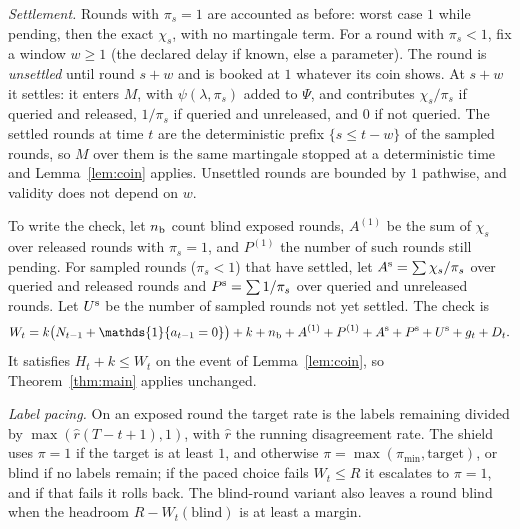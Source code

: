 \documentclass[10pt]{article}
\theoremstyle{plain}
\theoremstyle{definition}
\newcommand{\one}{\mathds{1}}
\begin{document}
\emph{Settlement.} Rounds with $\pi_s=1$ are accounted as before: worst case $1$ while pending, then the exact $\chi_s$, with no martingale term. For a round with $\pi_s<1$, fix a window $w\ge1$ (the declared delay if known, else a parameter). The round is \emph{unsettled} until round $s+w$ and is booked at $1$ whatever its coin shows. At $s+w$ it settles: it enters $M$, with $\psi(\lambda,\pi_s)$ added to $\Psi$, and contributes $\chi_s/\pi_s$ if queried and released, $1/\pi_s$ if queried and unreleased, and $0$ if not queried. The settled rounds at time $t$ are the deterministic prefix $\{s\le t-w\}$ of the sampled rounds, so $M$ over them is the same martingale stopped at a deterministic time and Lemma~\ref{lem:coin} applies. Unsettled rounds are bounded by $1$ pathwise, and validity does not depend on $w$.

To write the check, let $n_{\rm b}$ count blind exposed rounds, $A^{(1)}$ be the sum of $\chi_s$ over released rounds with $\pi_s=1$, and $P^{(1)}$ the number of such rounds still pending. For sampled rounds ($\pi_s<1$) that have settled, let $A^{\rm s}=\sum\chi_s/\pi_s$ over queried and released rounds and $P^{\rm s}=\sum1/\pi_s$ over queried and unreleased rounds. Let $U^{\rm s}$ be the number of sampled rounds not yet settled. The check is
\[
W_t=k\bigl(N_{t-1}+\one\{a_{t-1}=0\}\bigr)+k+n_{\rm b}+A^{(1)}+P^{(1)}+A^{\rm s}+P^{\rm s}+U^{\rm s}+g_t+D_t .
\]
It satisfies $H_t+k\le W_t$ on the event of Lemma~\ref{lem:coin}, so Theorem~\ref{thm:main} applies unchanged.

\emph{Label pacing.} On an exposed round the target rate is the labels remaining divided by $\max(\hat r(T-t+1),1)$, with $\hat r$ the running disagreement rate. The shield uses $\pi=1$ if the target is at least $1$, and otherwise $\pi=\max(\pi_{\min},\text{target})$, or blind if no labels remain; if the paced choice fails $W_t\le R$ it escalates to $\pi=1$, and if that fails it rolls back. The blind-round variant also leaves a round blind when the headroom $R-W_t(\text{blind})$ is at least a margin.
\end{document}
